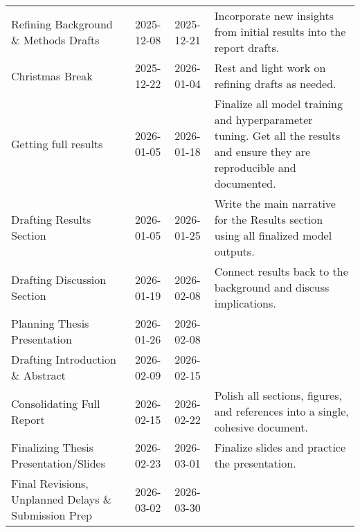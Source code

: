 \documentclass[12pt, a4paper]{article}
\begin{document}
\begin{table}[h!]
{\begin{tabularx}{\textwidth}{>{\RaggedRight}X l l >{\RaggedRight}X}
            Refining Background \& Methods Drafts                & 2025-12-08          & 2025-12-21        & Incorporate new insights from initial results into the report drafts.                                                       \\

            Christmas Break                                      & 2025-12-22          & 2026-01-04        & Rest and light work on refining drafts as needed.                                                                           \\

            Getting full results                                 & 2026-01-05          & 2026-01-18        & Finalize all model training and hyperparameter tuning. Get all the results and ensure they are reproducible and documented. \\

            Drafting Results Section                             & 2026-01-05          & 2026-01-25        & Write the main narrative for the Results section using all finalized model outputs.                                         \\

            Drafting Discussion Section                          & 2026-01-19          & 2026-02-08        & Connect results back to the background and discuss implications.                                                            \\

            Planning Thesis Presentation                         & 2026-01-26          & 2026-02-08        &                                                                                                                             \\

            Drafting Introduction \& Abstract                    & 2026-02-09          & 2026-02-15        &                                                                                                                             \\

            Consolidating Full Report                            & 2026-02-15          & 2026-02-22        & Polish all sections, figures, and references into a single, cohesive document.                                              \\

            Finalizing Thesis Presentation/Slides                & 2026-02-23          & 2026-03-01        & Finalize slides and practice the presentation.                                                                              \\

            Final Revisions, Unplanned Delays \& Submission Prep & 2026-03-02          & 2026-03-30        &                                                                                                                             \\
        \end{tabularx}
    }
\end{table}
\end{document}
